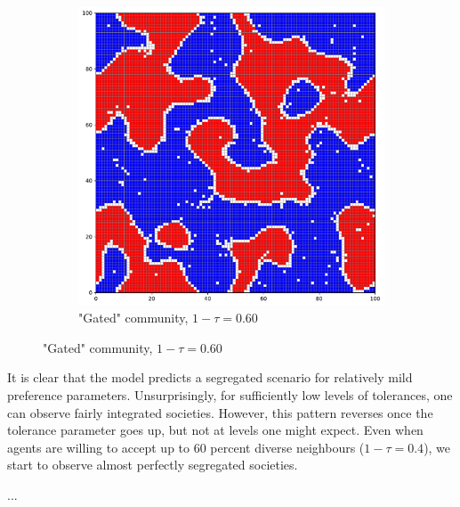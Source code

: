 \documentclass[../main.tex]{subfiles}
\begin{document}
\begin{figure}[H]
\begin{subfigure}{0.45\textwidth}
	\end{subfigure}
    \begin{subfigure}{0.45\textwidth}	
	\centering
     \caption{"Gated" community, $1-\tau = 0.60$}
	\includegraphics[width=\textwidth]{figs/schelling_model_0.6.pdf}	
	\end{subfigure}
\end{figure}

It is clear that the model predicts a segregated scenario for relatively mild preference parameters. Unsurprisingly, for sufficiently low levels of tolerances, one can observe fairly integrated societies. However, this pattern reverses once the tolerance parameter goes up, but not at levels one might expect. Even when agents are willing to accept up to 60 percent diverse neighbours ($1-\tau = 0.4$), we start to observe almost perfectly segregated societies.

...
\end{document}
